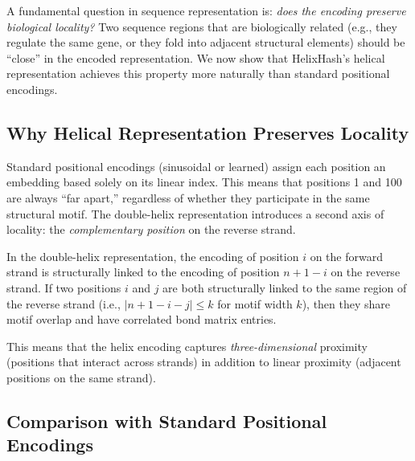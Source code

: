 A fundamental question in sequence representation is: \emph{does the encoding preserve biological locality?} Two sequence regions that are biologically related (e.g., they regulate the same gene, or they fold into adjacent structural elements) should be ``close'' in the encoded representation. We now show that HelixHash's helical representation achieves this property more naturally than standard positional encodings.

\subsection{Why Helical Representation Preserves Locality}

Standard positional encodings (sinusoidal or learned) assign each position an embedding based solely on its linear index. This means that positions 1 and 100 are always ``far apart,'' regardless of whether they participate in the same structural motif. The double-helix representation introduces a second axis of locality: the \emph{complementary position} on the reverse strand.

\begin{proposition}
In the double-helix representation, the encoding of position $i$ on the forward strand is structurally linked to the encoding of position $n + 1 - i$ on the reverse strand. If two positions $i$ and $j$ are both structurally linked to the same region of the reverse strand (i.e., $|n + 1 - i - j| \leq k$ for motif width $k$), then they share motif overlap and have correlated bond matrix entries.
\end{proposition}

This means that the helix encoding captures \emph{three-dimensional} proximity (positions that interact across strands) in addition to linear proximity (adjacent positions on the same strand).

\subsection{Comparison with Standard Positional Encodings}

